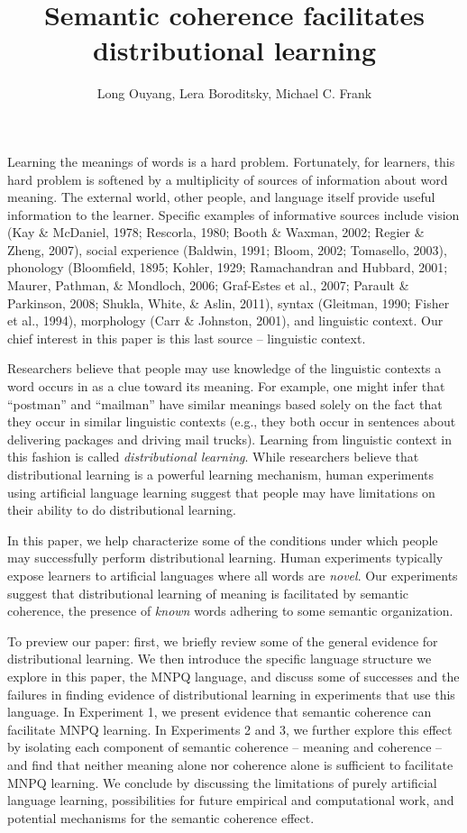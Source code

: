 \documentclass[man,floatsintext]{apa6}
\title{Semantic coherence facilitates distributional learning}
\author{Long Ouyang, Lera Boroditsky, Michael C. Frank}
\affiliation{Stanford University}
\begin{document}
\maketitle

Learning the meanings of words is a hard problem. Fortunately, for
learners, this hard problem is softened by a multiplicity of sources
of information about word meaning. The external world, other people,
and language itself provide useful information to the
learner. Specific examples of informative sources include vision (Kay
\& McDaniel, 1978; Rescorla, 1980; Booth \& Waxman, 2002; Regier \&
Zheng, 2007), social experience (Baldwin, 1991; Bloom, 2002;
Tomasello, 2003), phonology (Bloomfield, 1895; Kohler, 1929;
Ramachandran and Hubbard, 2001; Maurer, Pathman, \& Mondloch, 2006;
Graf-Estes et al., 2007; Parault \& Parkinson, 2008; Shukla, White, \&
Aslin, 2011), syntax (Gleitman, 1990; Fisher et al., 1994), morphology
(Carr \& Johnston, 2001), and linguistic context. Our chief interest
in this paper is this last source -- linguistic context.

Researchers believe that people may use knowledge of the linguistic
contexts a word occurs in as a clue toward its meaning. For example,
one might infer that ``postman'' and ``mailman'' have similar meanings
based solely on the fact that they occur in similar linguistic
contexts (e.g., they both occur in sentences about delivering packages
and driving mail trucks). Learning from linguistic context in this
fashion is called \emph{distributional learning}. While researchers
believe that distributional learning is a powerful learning mechanism,
human experiments using artificial language learning suggest that
people may have limitations on their ability to do distributional
learning.
 
In this paper, we help characterize some of the conditions under which
people may successfully perform distributional learning. Human
experiments typically expose learners to artificial languages where
all words are \emph{novel}. Our experiments suggest that
distributional learning of meaning is facilitated by semantic
coherence, the presence of \emph{known} words adhering to some
semantic organization.

To preview our paper: first, we briefly review some of the general
evidence for distributional learning. We then introduce the specific
language structure we explore in this paper, the MNPQ language, and
discuss some of successes and the failures in finding evidence of
distributional learning in experiments that use this language. In
Experiment 1, we present evidence that semantic coherence can
facilitate MNPQ learning. In Experiments 2 and 3, we further explore
this effect by isolating each component of semantic coherence --
meaning and coherence -- and find that neither meaning alone nor
coherence alone is sufficient to facilitate MNPQ learning. We conclude
by discussing the limitations of purely artificial language learning,
possibilities for future empirical and computational work, and
potential mechanisms for the semantic coherence effect.
\end{document}
